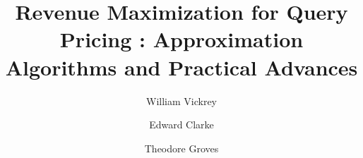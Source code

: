 \documentclass[format=acmsmall, review=false]{acmart}
\begin{document}
\title[Revenue Maximizing Algorithms for Query Pricing]{Revenue Maximization for Query Pricing : Approximation Algorithms and Practical Advances}  
\author{William Vickrey}
\author{Edward Clarke}
\author{Theodore Groves}


\maketitle






\end{document}
